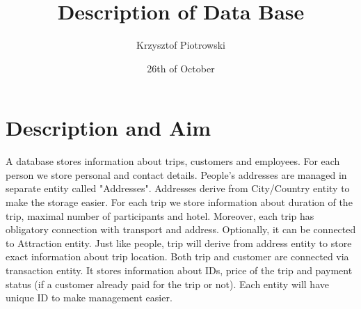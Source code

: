 \documentclass{article}
\title{Description of Data Base}
\author{Krzysztof Piotrowski}
\date{26th of October}
\begin{document}
\maketitle
\section{Description and Aim}
A database stores information about trips, customers and employees. 
For each person we store personal and contact details. 
People's addresses are managed in separate entity called "Addresses".
Addresses derive from City/Country entity to make the storage easier.
For each trip we store information about duration of the trip, maximal number of participants and hotel.
Moreover, each trip has obligatory connection with transport and address. 
Optionally, it can be connected to Attraction entity.
Just like people, trip will derive from address entity to store exact information about trip location.
Both trip and customer are connected via transaction entity.
It stores information about IDs, price of the trip and payment status (if a customer already paid for the trip or not).
Each entity will have unique ID to make management easier.
\end{document}
